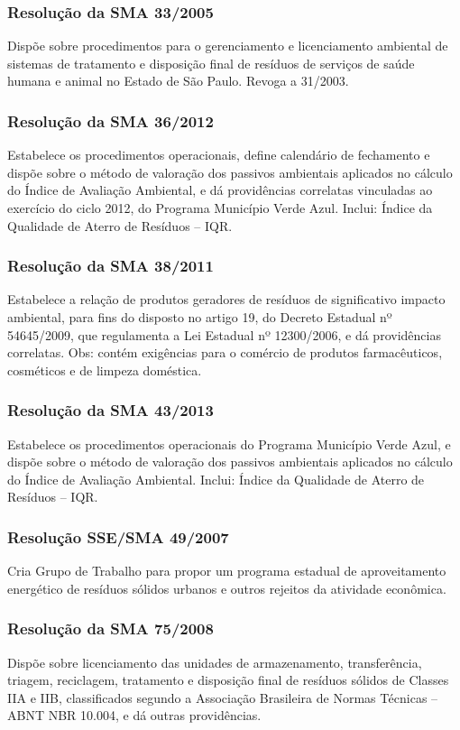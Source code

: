 \begin{subapend}
\begin{subsubapend}
		\subsubsection{Resolução da SMA 33/2005}
		Dispõe sobre procedimentos para o gerenciamento e licenciamento ambiental de sistemas de tratamento e disposição final de resíduos de serviços de saúde humana e animal no Estado de São Paulo. Revoga a 31/2003.
		\subsubsection{Resolução da SMA 36/2012}
		Estabelece os procedimentos operacionais, define calendário de fechamento e dispõe sobre o método de valoração dos passivos ambientais aplicados no cálculo do Índice de Avaliação Ambiental, e dá providências correlatas vinculadas ao exercício do ciclo 2012, do Programa Município Verde Azul. Inclui: Índice da Qualidade de Aterro de Resíduos – IQR.
		\subsubsection{Resolução da SMA 38/2011}
		Estabelece a relação de produtos geradores de resíduos de significativo impacto ambiental, para fins do disposto no artigo 19, do Decreto Estadual nº 54645/2009, que regulamenta a Lei Estadual nº 12300/2006, e dá providências correlatas. Obs: contém exigências para o comércio de produtos farmacêuticos, cosméticos e de limpeza doméstica.
		\subsubsection{Resolução da SMA 43/2013}
		Estabelece os procedimentos operacionais do Programa Município Verde Azul, e dispõe sobre o método de valoração dos passivos ambientais aplicados no cálculo do Índice de Avaliação Ambiental. Inclui: Índice da Qualidade de Aterro de Resíduos – IQR.
		\subsubsection{Resolução SSE/SMA 49/2007}
		Cria Grupo de Trabalho para propor um programa estadual de aproveitamento energético de resíduos sólidos urbanos e outros rejeitos da atividade econômica.
		\subsubsection{Resolução da SMA 75/2008}
		Dispõe sobre licenciamento das unidades de armazenamento, transferência, triagem, reciclagem, tratamento e disposição final de resíduos sólidos de Classes IIA e IIB, classificados segundo a Associação Brasileira de Normas Técnicas – ABNT NBR 10.004, e dá outras providências.

\end{subsubapend}
\end{subapend}
